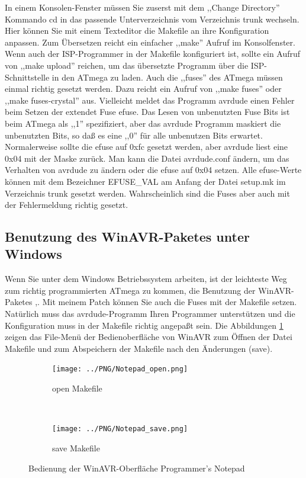 In einem Konsolen-Fenster müssen Sie zuserst mit dem ,,Change Directory'' Kommando cd in das passende 
Unterverzeichnis vom Verzeichnis trunk wechseln.
Hier können Sie mit einem Texteditor die Makefile an ihre Konfiguration anpassen.
Zum Übersetzen reicht ein einfacher ,,make'' Aufruf im Konsolfenster.
Wenn auch der ISP-Programmer in der Makefile konfiguriert ist, sollte ein Aufruf von ,,make upload''
reichen, um das übersetzte Programm über die ISP-Schnittstelle in den ATmega zu laden.
Auch die ,,fuses'' des ATmega müssen einmal richtig gesetzt werden.
Dazu reicht ein Aufruf von ,,make fuses'' oder ,,make fuses-crystal'' aus.
Vielleicht meldet das Programm avrdude einen Fehler beim Setzen der extendet Fuse efuse.
Das Lesen von unbenutzten Fuse Bits ist beim ATmega als ,,1'' spezifiziert, aber
das avrdude Programm maskiert die unbenutzten Bits, so daß es eine ,,0'' für alle unbenutzen Bits erwartet.
Normalerweise sollte die efuse auf 0xfc gesetzt werden, aber avrdude liest eine 0x04 mit der Maske zurück.
Man kann die Datei avrdude.conf ändern, um das Verhalten von avrdude zu ändern oder
die efuse auf 0x04 setzen. 
Alle efuse-Werte können mit dem Bezeichner EFUSE\_VAL am Anfang der Datei setup.mk im Verzeichnis trunk
gesetzt werden. Wahrscheinlich sind die Fuses aber auch mit der Fehlermeldung richtig gesetzt.



\subsection{Benutzung des WinAVR-Paketes unter Windows}
Wenn Sie unter dem Windows Betriebssystem arbeiten, ist der leichteste Weg zum
richtig programmierten ATmega zu kommen, die Benutzung der WinAVR-Paketes \cite{winavr1},\cite{winavr2}.
Mit meinem Patch \cite{winavr3} können Sie auch die Fuses mit der Makefile setzen.
Natürlich muss das avrdude-Programm Ihren Programmer unterstützen und die Konfiguration muss in
der Makefile richtig angepaßt sein.
Die Abbildungen \ref{fig:WinAVR1} zeigen das File-Menü der Bedienoberfläche von WinAVR zum
Öffnen der Datei Makefile und zum Abspeichern der Makefile nach den Änderungen (save).

\begin{figure}[H]
  \begin{subfigure}[b]{9cm}
    \centering
    \texttt{[image: ../PNG/Notepad\_open.png]}
    \caption{open Makefile}
  \end{subfigure}
  ~
  \begin{subfigure}[b]{9cm}
    \centering
    \texttt{[image: ../PNG/Notepad\_save.png]}
    \caption{save Makefile}
  \end{subfigure}
  \caption{Bedienung der WinAVR-Oberfläche Programmer's Notepad}
  \label{fig:WinAVR1}
\end{figure}

